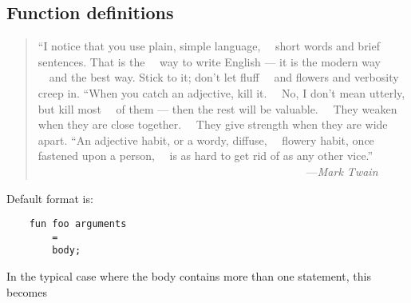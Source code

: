 \subsection{Function definitions}


\begin{quote}\begin{tiny}
                   ``I notice that you use plain, simple language,\newline
                   ~~short words and brief sentences. That is the\newline
                   ~~way to write English --- it is the modern way\newline
                   ~~and the best way. Stick to it; don't let fluff\newline
                   ~~and flowers and verbosity creep in.\newline
\newline
                   ``When you catch an adjective, kill it.\newline
                   ~~No, I don't mean utterly, but kill most\newline
                   ~~of them --- then the rest will be valuable.\newline
                   ~~They weaken when they are close together.\newline
                   ~~They give strength when they are wide apart.\newline
\newline
                   ``An adjective habit, or a wordy, diffuse,\newline
                   ~~flowery habit, once fastened upon a person,\newline
                   ~~is as hard to get rid of as any other vice.''\newline
\newline
               ~~~~~~~~~~~~~~~~~~~~~~~~~~~~~~~~~~~~~~~~~~~~~~~~---{\em Mark Twain}
\end{tiny}\end{quote}


Default format is:

\begin{verbatim}
    fun foo arguments
        =
        body;
\end{verbatim}

In the typical case where the body contains more than one statement, this becomes

